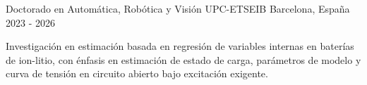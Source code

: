 \cventry
  {Doctorado en Autom\'atica, Rob\'otica y Visi\'on}
  {UPC-ETSEIB}
  {Barcelona, Espa\~na}
  {2023 - 2026}
  {
    \begin{cvitems}
      \item {Investigaci\'on en estimaci\'on basada en regresi\'on de variables internas en bater\'ias de ion-litio, con \'enfasis en estimaci\'on de estado de carga, par\'ametros de modelo y curva de tensi\'on en circuito abierto bajo excitaci\'on exigente.}
    \end{cvitems}
  }
